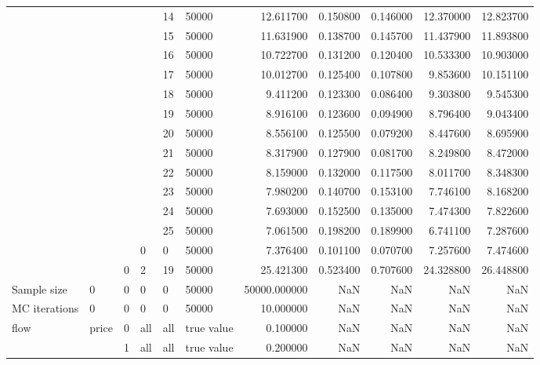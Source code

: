 \begin{tabular}{llllllrrrrr}
\cline{5-11}
 &  &  &  & 14 & 50000 & 12.611700 & 0.150800 & 0.146000 & 12.370000 & 12.823700 \\
\cline{5-11}
 &  &  &  & 15 & 50000 & 11.631900 & 0.138700 & 0.145700 & 11.437900 & 11.893800 \\
\cline{5-11}
 &  &  &  & 16 & 50000 & 10.722700 & 0.131200 & 0.120400 & 10.533300 & 10.903000 \\
\cline{5-11}
 &  &  &  & 17 & 50000 & 10.012700 & 0.125400 & 0.107800 & 9.853600 & 10.151100 \\
\cline{5-11}
 &  &  &  & 18 & 50000 & 9.411200 & 0.123300 & 0.086400 & 9.303800 & 9.545300 \\
\cline{5-11}
 &  &  &  & 19 & 50000 & 8.916100 & 0.123600 & 0.094900 & 8.796400 & 9.043400 \\
\cline{5-11}
 &  &  &  & 20 & 50000 & 8.556100 & 0.125500 & 0.079200 & 8.447600 & 8.695900 \\
\cline{5-11}
 &  &  &  & 21 & 50000 & 8.317900 & 0.127900 & 0.081700 & 8.249800 & 8.472000 \\
\cline{5-11}
 &  &  &  & 22 & 50000 & 8.159000 & 0.132000 & 0.117500 & 8.011700 & 8.348300 \\
\cline{5-11}
 &  &  &  & 23 & 50000 & 7.980200 & 0.140700 & 0.153100 & 7.746100 & 8.168200 \\
\cline{5-11}
 &  &  &  & 24 & 50000 & 7.693000 & 0.152500 & 0.135000 & 7.474300 & 7.822600 \\
\cline{5-11}
 &  &  &  & 25 & 50000 & 7.061500 & 0.198200 & 0.189900 & 6.741100 & 7.287600 \\
\cline{4-11} \cline{5-11}
 &  &  & 0 & 0 & 50000 & 7.376400 & 0.101100 & 0.070700 & 7.257600 & 7.474600 \\
\cline{3-11} \cline{4-11} \cline{5-11}
 &  & 0 & 2 & 19 & 50000 & 25.421300 & 0.523400 & 0.707600 & 24.328800 & 26.448800 \\
\cline{1-11} \cline{2-11} \cline{3-11} \cline{4-11} \cline{5-11}
Sample size & 0 & 0 & 0 & 0 & 50000 & 50000.000000 & NaN & NaN & NaN & NaN \\
\cline{1-11} \cline{2-11} \cline{3-11} \cline{4-11} \cline{5-11}
MC iterations & 0 & 0 & 0 & 0 & 50000 & 10.000000 & NaN & NaN & NaN & NaN \\
\cline{1-11} \cline{2-11} \cline{3-11} \cline{4-11} \cline{5-11}
\multirow[t]{37}{*}{flow} & \multirow[t]{2}{*}{price} & 0 & all & all & true value & 0.100000 & NaN & NaN & NaN & NaN \\
\cline{3-11} \cline{4-11} \cline{5-11}
 &  & 1 & all & all & true value & 0.200000 & NaN & NaN & NaN & NaN \\

\end{tabular}
